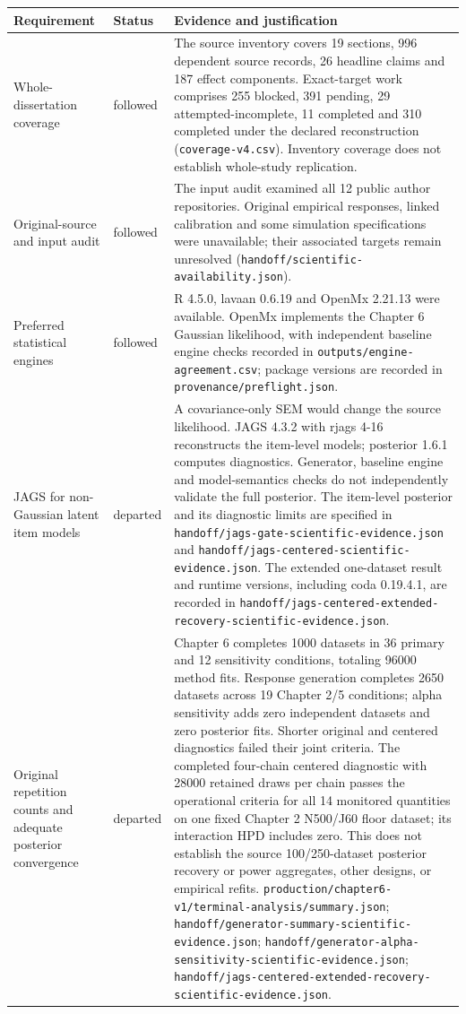 \documentclass[11pt]{article}
\begin{document}
\begin{longtable}{p{95pt}p{49pt}p{293pt}}
\toprule Requirement & Status & Evidence and justification\\\midrule\endhead
Whole-dissertation coverage & followed &  The source inventory covers 19 sections, 996 dependent source records, 26 headline claims and 187 effect components. Exact-target work comprises 255 blocked, 391 pending, 29 attempted-incomplete, 11 completed and 310 completed under the declared reconstruction (\nolinkurl{coverage-v4.csv}). Inventory coverage does not establish whole-study replication.\\
Original-source and input audit & followed &  The input audit examined all 12 public author repositories. Original empirical responses, linked calibration and some simulation specifications were unavailable; their associated targets remain unresolved (\nolinkurl{handoff/scientific-availability.json}).\\
Preferred statistical engines & followed &  R 4.5.0, lavaan 0.6.19 and OpenMx 2.21.13 were available. OpenMx implements the Chapter 6 Gaussian likelihood, with independent baseline engine checks recorded in \nolinkurl{outputs/engine-agreement.csv}; package versions are recorded in \nolinkurl{provenance/preflight.json}.\\
JAGS for non-Gaussian latent item models & departed & A covariance-only SEM would change the source likelihood. JAGS 4.3.2 with rjags 4-16 reconstructs the item-level models; posterior 1.6.1 computes diagnostics. Generator, baseline engine and model-semantics checks do not independently validate the full posterior. The item-level posterior and its diagnostic limits are specified in \nolinkurl{handoff/jags-gate-scientific-evidence.json} and \nolinkurl{handoff/jags-centered-scientific-evidence.json}. The extended one-dataset result and runtime versions, including coda 0.19.4.1, are recorded in \nolinkurl{handoff/jags-centered-extended-recovery-scientific-evidence.json}.\\
Original repetition counts and adequate posterior convergence & departed & Chapter 6 completes 1000 datasets in 36 primary and 12 sensitivity conditions, totaling 96000 method fits. Response generation completes 2650 datasets across 19 Chapter 2/5 conditions; alpha sensitivity adds zero independent datasets and zero posterior fits. Shorter original and centered diagnostics failed their joint criteria. The completed four-chain centered diagnostic with 28000 retained draws per chain passes the operational criteria for all 14 monitored quantities on one fixed Chapter 2 N500/J60 floor dataset; its interaction HPD includes zero. This does not establish the source 100/250-dataset posterior recovery or power aggregates, other designs, or empirical refits. \nolinkurl{production/chapter6-v1/terminal-analysis/summary.json}; \nolinkurl{handoff/generator-summary-scientific-evidence.json}; \nolinkurl{handoff/generator-alpha-sensitivity-scientific-evidence.json}; \nolinkurl{handoff/jags-centered-extended-recovery-scientific-evidence.json}.\\

\end{longtable}
\end{document}
